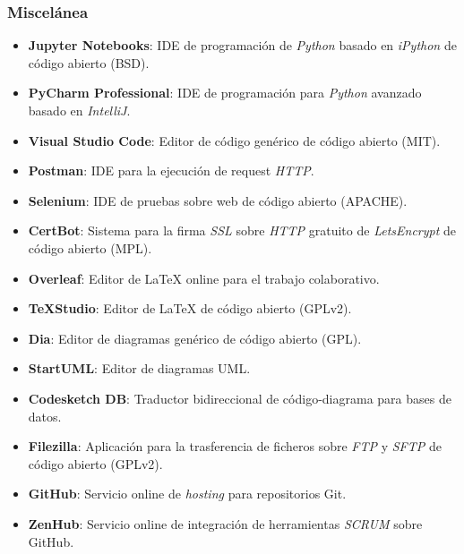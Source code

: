 \subsubsection{Miscelánea}
\begin{itemize}
	\item \textbf{Jupyter Notebooks}: IDE de programación de \textit{Python} basado en \textit{iPython} de código abierto (BSD).
	\item \textbf{PyCharm Professional}: IDE de programación para \textit{Python} avanzado basado en \textit{IntelliJ}.
	\item \textbf{Visual Studio Code}: Editor de código genérico de código abierto (MIT).
	\item \textbf{Postman}: IDE para la ejecución de request \textit{HTTP}.
	\item \textbf{Selenium}: IDE de pruebas sobre web de código abierto (APACHE).
	\item \textbf{CertBot}: Sistema para la firma \textit{SSL} sobre \textit{HTTP} gratuito de \textit{LetsEncrypt} de código abierto (MPL).
	\item \textbf{Overleaf}: Editor de \LaTeX{} online para el trabajo colaborativo.
	\item \textbf{\TeX{}Studio}: Editor de \LaTeX{} de código abierto (GPLv2).
	\item \textbf{Dia}: Editor de diagramas genérico de código abierto (GPL).
	\item \textbf{StartUML}: Editor de diagramas UML.
	\item \textbf{Codesketch DB}: Traductor bidireccional de código-diagrama para bases de datos.
	\item \textbf{Filezilla}: Aplicación para la trasferencia de ficheros sobre \textit{FTP} y \textit{SFTP} de código abierto (GPLv2).
	\item \textbf{GitHub}: Servicio online de \textit{hosting} para repositorios Git.
	\item \textbf{ZenHub}: Servicio online de integración de herramientas \textit{SCRUM} sobre GitHub.
\end{itemize}
